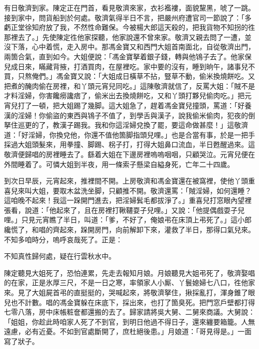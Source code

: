 有日敬濟到家。陳定正在門首，看見敬濟來家，衣衫襤褸，面貌黧黑，唬了一跳。接到家中，問貨船到於何處。敬濟氣得半日不言，把嚴州府遭官司一節說了：「多虧正堂徐知府放了我，不然性命難保。{}今被楊大郎這天殺的，把我貨物不知拐的徃那裡去了。」先使陳定徃他家探聽，他家說還不曾來家。敬濟又親去問了一遭，並沒下落，心中着慌，走入房中。那馮金寶又和西門大姐首南面北，自從敬濟出門，兩箇合氣，直到如今。大姐便說：「馮金寶拏着銀子錢，轉與他鴇子去了。他家保兒成日來，瞞藏背掖，打酒買肉，在屋裡吃。家中要的沒有，睡到晌午，諸事兒不買，只熬俺們。」馮金寶又說：「大姐成日橫草不拈，豎草不動，偷米換燒餅吃。又把煮的醃肉偷在房裡，和丫頭元宵兒同吃。」這陳敬濟就信了，{}反罵大姐：「賊不是才料淫婦，你害饞癆讒痞了，偷米出去換燒餅吃，又和丫頭打夥兒偷肉吃。」把元宵兒打了一頓，把大姐踢了幾脚。這大姐急了，趕着馮金寶兒撞頭，罵道：「好養漢的淫婦！你偷盜的東西與鴇子不值了，到學舌與漢子，說我偷米偷肉，犯夜的倒拏住巡更的了，教漢子踢我。我和你這淫婦兌換了罷，要這命做甚麼！」這敬濟道：「好淫婦，你換兌他，你還不值他箇脚指頭兒哩。」也是合當有事，於是一把手採過大姐頭髮來，用拳撞、脚踢、柺子打，打得大姐鼻口流血，半日甦醒過來。這敬濟便歸唱的房裡睡去了。繇着大姐在下邊房裡嗚嗚咽咽，只顧哭泣。{}元宵兒便在外間睡着了。可憐大姐到半夜，用一條索子懸梁自縊身死，亡年二十四歲。

到次日早辰，元宵起來，推裡間不開。上房敬濟和馮金寶還在被窩裡，使他丫頭重喜兒來叫大姐，要取木盆洗坐脚，只顧推不開。敬濟還罵：「賊淫婦，如何還睡？這咱晚不起來！我這一跺開門進去，把淫婦鬂毛都拔淨了。」重喜兒打窓眼內望裡張看，說道：「他起來了，且在房裡打鞦韆耍子兒哩。」又說：「他提偶戲耍子兒哩。」只見元宵瞧了半日，叫道：「爹，不好了，俺娘弔在床頂上弔死了。」這小郎纔慌了，和唱的齊起來，跺開房門，向前解卸下來，灌救了半日，那得口氣兒來。不知多咱時分，嗚呼哀哉死了。正是：

\begin{myquote}
不知真性歸何處，疑在行雲秋水中。
\end{myquote}

陳定聽見大姐死了，恐怕連累，先走去報知月娘。{}月娘聽見大姐弔死了，敬濟娶唱的在家，正是氷厚三尺，不是一日之寒，率領家人小厮、丫鬟媳婦七八口，徃他家來。見了大姐屍首弔的直挺挺的，哭喊起來，將敬濟拏住，揪採亂打，渾身錐了眼兒也不計數。{}唱的馮金寶躲在床底下，採出來，也打了箇臭死。把門窓戶壁都打得七零八落，房中床帳粧奩都還搬的去了。歸家請將吳大舅、二舅來商議。大舅說：「姐姐，你趁此時咱家人死了不到官，到明日他過不得日子，還來纏要箱籠。人無遠慮，必有近憂。不如到官處斷開了，庶杜絕後患。」{}月娘道：「哥見得是。」一面寫了狀子。


